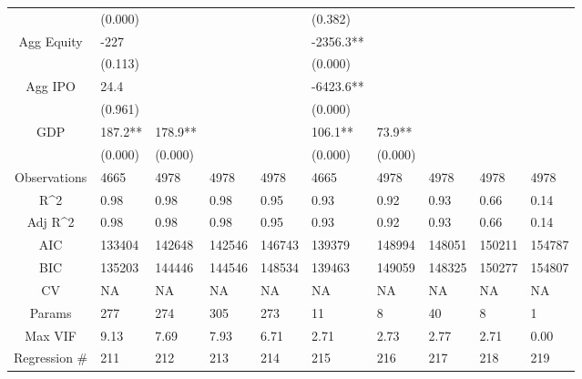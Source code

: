 \documentclass{article}
\begin{document}
\begin{table}[H]
\begin{tabular}{|clllllllll|}
   & (0.000) &  &  &  & (0.382) &  &  &  &  \\ 
  Agg Equity & -227 &  &  &  & -2356.3** &  &  &  &  \\ 
   & (0.113) &  &  &  & (0.000) &  &  &  &  \\ 
  Agg IPO & 24.4 &  &  &  & -6423.6** &  &  &  &  \\ 
   & (0.961) &  &  &  & (0.000) &  &  &  &  \\ 
  GDP & 187.2** & 178.9** &  &  & 106.1** & 73.9** &  &  &  \\ 
   & (0.000) & (0.000) &  &  & (0.000) & (0.000) &  &  &  \\ 
  \hline 
 Observations & 4665 & 4978 & 4978 & 4978 & 4665 & 4978 & 4978 & 4978 & 4978 \\ 
  R^2 & 0.98 & 0.98 & 0.98 & 0.95 & 0.93 & 0.92 & 0.93 & 0.66 & 0.14 \\ 
  Adj R^2 & 0.98 & 0.98 & 0.98 & 0.95 & 0.93 & 0.92 & 0.93 & 0.66 & 0.14 \\ 
  AIC & 133404 & 142648 & 142546 & 146743 & 139379 & 148994 & 148051 & 150211 & 154787 \\ 
  BIC & 135203 & 144446 & 144546 & 148534 & 139463 & 149059 & 148325 & 150277 & 154807 \\ 
  CV & NA & NA & NA & NA & NA & NA & NA & NA & NA \\ 
  Params & 277 & 274 & 305 & 273 & 11 & 8 & 40 & 8 & 1 \\ 
  Max VIF & 9.13 & 7.69 & 7.93 & 6.71 & 2.71 & 2.73 & 2.77 & 2.71 & 0.00 \\ 
  Regression \# & 211 & 212 & 213 & 214 & 215 & 216 & 217 & 218 & 219 \\ 
   \hline
\end{tabular}
 
\end{table}
\end{document}
